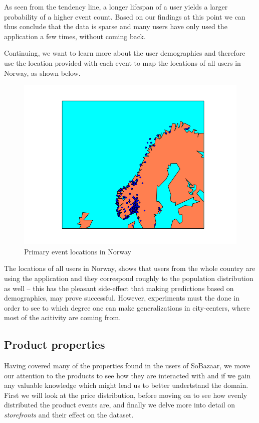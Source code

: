 As seen from the tendency line, a longer lifespan of a user yields a larger
probability of a higher event count. Based on our findings at this point we can
thus conclude that the data is sparse and many users have only used the
application a few times, without coming back.

Continuing, we want to learn more about the user demographics and therefore use
the location provided with each event to map the locations of all users in
Norway, as shown below.


\begin{figure}[H]
  \includegraphics[width=5in]{image/simpleGeoPlotNorway.png}
  \centering
  \caption{Primary event locations in Norway}
  \label{figure:croppedGeoplot}
\end{figure}

The locations of all users in Norway, shows that users from the whole country
are using the application and they correspond roughly to the population
distribution as well -- this has the pleasant side-effect that making
predictions based on demographics, may prove successful. However, experiments
must the done in order to see to which degree one can make generalizations in
city-centers, where most of the acitivity are coming from.

\subsection{Product properties}

Having covered many of the properties found in the users of SoBazaar, we move
our attention to the products to see how they are interacted with and if we
gain any valuable knowledge which might lead us to better undertstand the
domain. First we will look at the price distribution, before moving on to see
how evenly distributed the product events are, and finally we delve more into
detail on \textit{storefronts} and their effect on the dataset.

